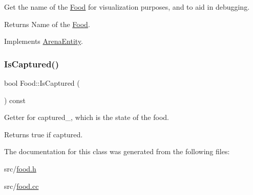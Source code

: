 Get the name of the \mbox{\hyperlink{class_food}{Food}} for visualization purposes, and to aid in debugging. 

\begin{DoxyReturn}{Returns}
Name of the \mbox{\hyperlink{class_food}{Food}}. 
\end{DoxyReturn}


Implements \mbox{\hyperlink{class_arena_entity_ad43152003033cf01ad86eeff1990b69a}{Arena\+Entity}}.

\mbox{\label{class_food_a81c160e9e591b4a4eb9662efb7130ee8}} 
\subsubsection{\texorpdfstring{Is\+Captured()}{IsCaptured()}}
{\footnotesize\ttfamily bool Food\+::\+Is\+Captured (\begin{DoxyParamCaption}{ }\end{DoxyParamCaption}) const\hspace{0.3cm}{\ttfamily [inline]}}



Getter for captured\+\_\+, which is the state of the food. 

\begin{DoxyReturn}{Returns}
true if captured. 
\end{DoxyReturn}


The documentation for this class was generated from the following files\+:\begin{DoxyCompactItemize}
\item 
src/\mbox{\hyperlink{food_8h}{food.\+h}}\item 
src/\mbox{\hyperlink{food_8cc}{food.\+cc}}\end{DoxyCompactItemize}
